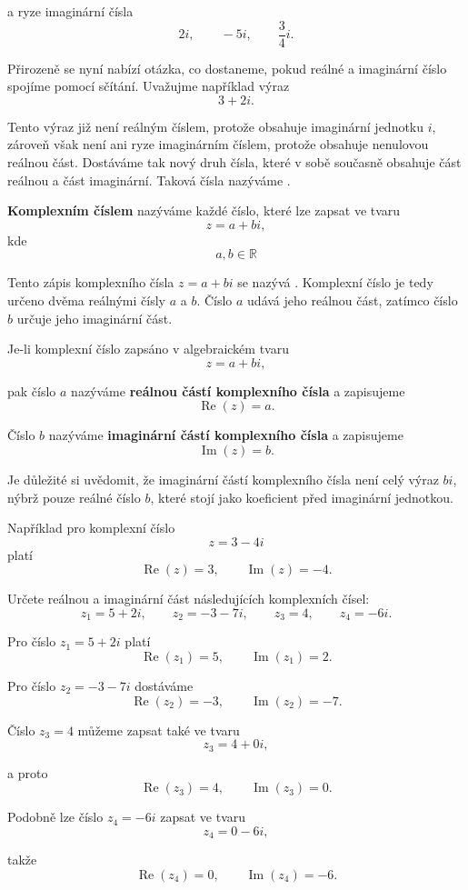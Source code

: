 \documentclass[12pt,a4paper]{article}
\begin{document}
a ryze imaginární čísla
\[
    2i,\qquad -5i,\qquad \frac{3}{4}i.
\]

Přirozeně se nyní nabízí otázka, co dostaneme, pokud reálné 
a imaginární číslo spojíme pomocí sčítání. Uvažujme například výraz
\[
    3+2i.
\]

Tento výraz již není reálným číslem, protože obsahuje imaginární jednotku $i$,
zároveň však není ani ryze imaginárním číslem, protože obsahuje nenulovou reálnou část.
Dostáváme tak nový druh čísla, které v sobě současně obsahuje část reálnou a část imaginární.
Taková čísla nazýváme .

\begin{definitionbox}
    \textbf{Komplexním číslem} nazýváme každé číslo, které lze zapsat ve tvaru
    \[
        z=a+bi,
    \]
    kde
    \[
        a,b\in\mathbb{R}
    \]
\end{definitionbox}

Tento zápis komplexního čísla $z=a+bi$ se nazývá .
Komplexní číslo je tedy určeno dvěma reálnými čísly $a$ a $b$. Číslo $a$
udává jeho reálnou část, zatímco číslo $b$ určuje jeho imaginární část.

\begin{definitionbox}
    Je-li komplexní číslo zapsáno v algebraickém tvaru
    \[
        z=a+bi,
    \]

    pak číslo $a$ nazýváme \textbf{reálnou částí komplexního čísla} a zapisujeme
    \[
        \operatorname{Re}(z)=a.
    \]

    Číslo $b$ nazýváme \textbf{imaginární částí komplexního čísla} a zapisujeme
    \[
        \operatorname{Im}(z)=b.
    \]
\end{definitionbox}

Je důležité si uvědomit, že imaginární částí komplexního čísla není celý výraz $bi$,
nýbrž pouze reálné číslo $b$, které stojí jako koeficient před imaginární jednotkou.

Například pro komplexní číslo
\[
    z=3-4i
\]
platí
\[
    \operatorname{Re}(z)=3,
    \qquad
    \operatorname{Im}(z)=-4.
\]

\begin{examplebox}
    Určete reálnou a imaginární část následujících komplexních čísel:
    \[
        z_1=5+2i,\qquad z_2=-3-7i,\qquad z_3=4,\qquad z_4=-6i.
    \]

    Pro číslo $z_1=5+2i$ platí
    \[
        \operatorname{Re}(z_1)=5, \qquad \operatorname{Im}(z_1)=2.
    \]

    Pro číslo $z_2=-3-7i$ dostáváme
    \[
        \operatorname{Re}(z_2)=-3, \qquad \operatorname{Im}(z_2)=-7.
    \]

    Číslo $z_3=4$ můžeme zapsat také ve tvaru
    \[
        z_3=4+0i,
    \]

    a proto
    \[
        \operatorname{Re}(z_3)=4, \qquad \operatorname{Im}(z_3)=0.
    \]

    Podobně lze číslo $z_4=-6i$ zapsat ve tvaru
    \[
        z_4=0-6i,
    \]

    takže
    \[
        \operatorname{Re}(z_4)=0, \qquad \operatorname{Im}(z_4)=-6.
    \]
\end{examplebox}
\end{document}
